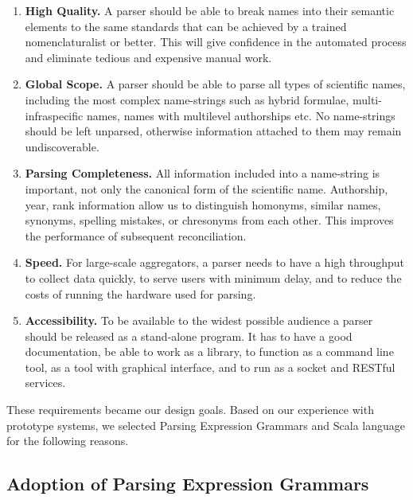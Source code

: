\documentclass{bmcart}
\begin{document}
\begin{enumerate}

  \item \textbf{High Quality.} A parser should be able to break names into
    their semantic elements to the same standards that can be achieved by a
    trained nomenclaturalist or better. This will give confidence in the
    automated process and eliminate tedious and expensive manual work.

  \item \textbf{Global Scope.} A parser should be able to parse all types of
    scientific names, including the most complex name-strings such as hybrid
    formulae, multi-infraspecific names, names with multilevel authorships etc.
    No name-strings should be left unparsed, otherwise information attached to
    them may remain undiscoverable.

  \item \textbf{Parsing Completeness.} All information included into a
    name-string is important, not only the canonical form of the scientific
    name. Authorship, year, rank information allow us to distinguish homonyms,
    similar names, synonyms, spelling mistakes, or chresonyms from each other.
    This improves the performance of subsequent reconciliation.

  \item \textbf{Speed.} For large-scale aggregators, a parser needs to have a
    high throughput to collect data quickly, to serve users with minimum delay,
    and to reduce the costs of running the hardware used for parsing.

  \item \textbf{Accessibility.} To be available to the widest possible audience
    a parser should be released as a stand-alone program. It has to have a good
    documentation, be able to work as a library, to function as a command line
    tool, as a tool with graphical interface, and to run as a socket and
    RESTful services.

\end{enumerate}

These requirements became our design goals. Based on our experience with
prototype systems, we selected Parsing Expression Grammars and Scala language
for the following reasons.

\subsection*{Adoption of Parsing Expression Grammars}
\end{document}
